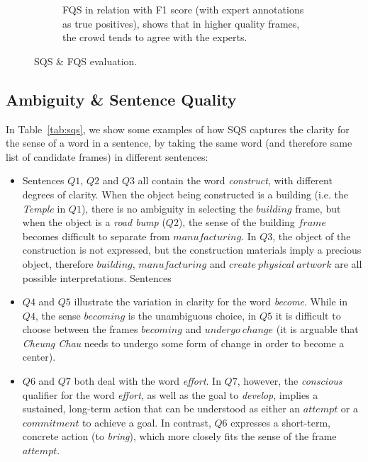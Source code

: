 \begin{figure}[htb!]
\begin{subfigure}{.5\textwidth}
\caption{FQS in relation with F1 score (with expert annotations as true positives), shows that in higher quality frames, the crowd tends to agree with the experts.}
\label{fig:fqs_f1}
\end{subfigure}
\caption{SQS \& FQS evaluation.}
\end{figure}


\subsection{Ambiguity \& Sentence Quality}

In Table~\ref{tab:sqs}, we show some examples of how SQS captures the clarity for the sense of a word in a sentence, by taking the same word (and therefore same list of candidate frames) in different sentences:


\begin{itemize}

\item Sentences $Q1$, $Q2$ and $Q3$ all contain the word \textit{construct}, with different degrees of clarity. When the object being constructed is a building (i.e. the \textit{Temple} in $Q1$), there is no ambiguity in selecting the $building$ frame, but when the object is a \textit{road bump} ($Q2$), the sense of the building $frame$ becomes difficult to separate from $manufacturing$. In $Q3$, the object of the construction is not expressed, but the construction materials imply a precious object, therefore $building$, $manufacturing$ and $create\ physical\ artwork$ are all possible interpretations. Sentences 

\item $Q4$ and $Q5$ illustrate the variation in clarity for the word \textit{become}. While in $Q4$, the sense $becoming$ is the unambiguous choice, in $Q5$ it is difficult to choose between the frames $becoming$ and $undergo\ change$ (it is arguable that \textit{Cheung Chau} needs to undergo some form of change in order to become a center).

\item $Q6$ and $Q7$ both deal with the word \textit{effort}. In $Q7$, however, the \textit{conscious} qualifier for the word \textit{effort}, as well as the goal to \textit{develop}, implies a sustained, long-term action that can be understood as either an $attempt$ or a $commitment$ to achieve a goal. In contrast, $Q6$ expresses a short-term, concrete action (to \textit{bring}), which more closely fits the sense of the frame $attempt$.

\end{itemize}

